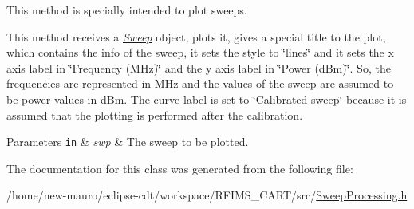 This method is specially intended to plot sweeps. 

This method receives a {\itshape \hyperlink{structSweep}{Sweep}} object, plots it, gives a special title to the plot, which contains the info of the sweep, it sets the style to \char`\"{}lines\char`\"{} and it sets the x axis label in \char`\"{}\+Frequency (\+M\+Hz)\char`\"{} and the y axis label in \char`\"{}\+Power (d\+Bm)\char`\"{}. So, the frequencies are represented in M\+Hz and the values of the sweep are assumed to be power values in d\+Bm. The curve label is set to \char`\"{}\+Calibrated sweep\char`\"{} because it is assumed that the plotting is performed after the calibration. 
\begin{DoxyParams}[1]{Parameters}
\mbox{\tt in}  & {\em swp} & The sweep to be plotted. \\
\hline
\end{DoxyParams}


The documentation for this class was generated from the following file\+:\begin{DoxyCompactItemize}
\item 
/home/new-\/mauro/eclipse-\/cdt/workspace/\+R\+F\+I\+M\+S\+\_\+\+C\+A\+R\+T/src/\hyperlink{SweepProcessing_8h}{Sweep\+Processing.\+h}\end{DoxyCompactItemize}
